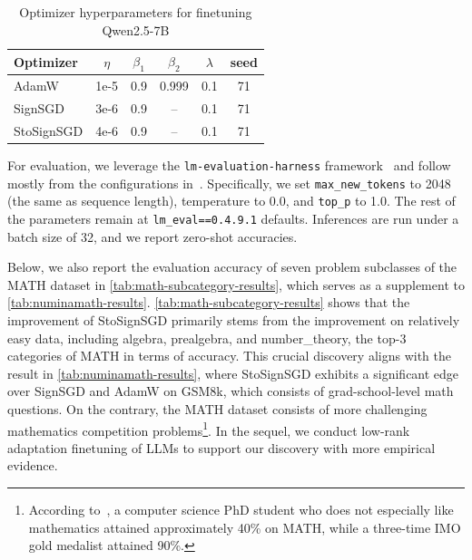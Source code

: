 \documentclass{article}
\begin{document}
\begin{table}[htbp]
\centering
\caption{Optimizer hyperparameters for finetuning Qwen2.5-7B\label{tab:optimizer-hp-qwen}}
\centering
\begin{tabular}{lccccc}
\toprule
\textbf{Optimizer} & $\eta$ & $\beta_1$ & $\beta_2$ & $\lambda$ & seed\\
\midrule
AdamW   & 1e-5 & 0.9 & 0.999 & 0.1 & 71\\
SignSGD & 3e-6 & 0.9 & -- & 0.1  & 71\\
StoSignSGD & 4e-6 & 0.9 & -- & 0.1 & 71\\
\bottomrule
\end{tabular}
\end{table}
For evaluation, we leverage the \texttt{lm-evaluation-harness} framework~\citep{eval-harness} and follow mostly from the configurations in~\citet{pan-etal-2025-scalebio}. Specifically, we set \texttt{max\_new\_tokens} to 2048 (the same as sequence length), temperature to 0.0, and \texttt{top\_p} to 1.0. The rest of the parameters remain at \texttt{lm\_eval==0.4.9.1} defaults. Inferences are run under a batch size of 32, and we report zero-shot accuracies.

Below, we also report the evaluation accuracy of seven problem subclasses of the MATH dataset in \cref{tab:math-subcategory-results}, which serves as a supplement to \cref{tab:numinamath-results}. \cref{tab:math-subcategory-results} shows that the improvement of StoSignSGD primarily stems from the improvement on relatively easy data, including algebra, prealgebra, and number\_theory, the top-3 categories of MATH in terms of accuracy. This crucial discovery aligns with the result in \cref{tab:numinamath-results}, where StoSignSGD exhibits a significant edge over SignSGD and AdamW on GSM8k, which consists of grad-school-level math questions. On the contrary, the MATH dataset consists of more challenging mathematics competition problems\footnote{According to~\citet{hendrycks2021math}, a computer science PhD student who does not especially like mathematics attained
approximately 40\% on MATH, while a three-time IMO gold medalist attained 90\%.}. In the sequel, we conduct low-rank adaptation finetuning of LLMs to support our discovery with more empirical evidence.
\end{document}
